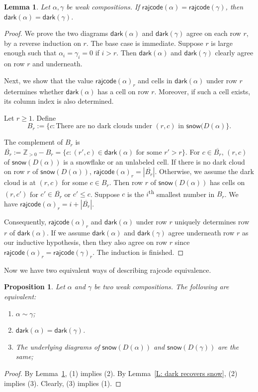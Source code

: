 \documentclass[10pt]{amsart}
\theoremstyle{plain}
\theoremstyle{plain}
\theoremstyle{definition}
\theoremstyle{definition}
\theoremstyle{definition}
\theoremstyle{plain}
\theoremstyle{plain}
\theoremstyle{plain}
\newtheorem{lemma}[lemma]{Lemma}
\theoremstyle{plain}
\newtheorem{prop}[prop]{Proposition}
\theoremstyle{plain}
\theoremstyle{remark}
\theoremstyle{remark}
\theoremstyle{plain}
\theoremstyle{plain}
\newcommand{\dark}{\mathsf{dark}}
\newcommand{\snow}{\mathsf{snow}}
\newcommand{\rajcode}{\mathsf{rajcode}}
\begin{document}
\begin{lemma}
\label{L: same rajcode => same dark}
Let $\alpha, \gamma$ be weak compositions.
If $\rajcode(\alpha) = \rajcode(\gamma)$,
then $\dark(\alpha) = \dark(\gamma)$.
\end{lemma}
\begin{proof}
We prove the two diagrams $\dark(\alpha)$ 
and $\dark(\gamma)$ agree on each row $r$,
by a reverse induction on $r$.
The base case is immediate.
Suppose $r$ is large enough
such that $\alpha_i = \gamma_i = 0$
if $i > r$.
Then $\dark(\alpha)$ and $\dark(\gamma)$
clearly agree on row $r$ and underneath.

Next, we show that the value $\rajcode(\alpha)_r$ and cells in $\dark(\alpha)$ under row $r$ 
determines whether $\dark(\alpha)$ has a cell on row $r$.
Moreover, if such a cell exists, its column index is also determined. 

Let $r\geqslant 1$.
Define
$$B_r :=\{c: \textrm{There are no dark clouds under } (r,c) \textrm{ in } \snow(D(\alpha) \}.$$

The complement of $B_r$ is $\overline{B_r} := \mathbb{Z}_{>0} - B_r = \{c: (r',c) \in \dark(\alpha) \textrm{ for some } r' > r \}$.
For $c \in \overline{B_r}$,
$(r,c)$ of $\snow(D(\alpha))$ is a snowflake or an unlabeled cell.
If there is no dark cloud on row $r$ of $\snow(D(\alpha))$,
$\rajcode(\alpha)_r = |\overline{B_r}|$.
Otherwise, we assume the dark cloud is at $(r,c)$ for some $c \in B_r$.
Then row $r$ of $\snow(D(\alpha))$ has cells on 
$(r,c')$ for $c' \in \overline{B_r}$ or $c' \leq c$.
Suppose $c$ is the $i$\textsuperscript{th} smallest number in $B_r$.
We have $\rajcode(\alpha)_r = i + |\overline{B_r}|$.

Consequently, $\rajcode(\alpha)_r$ and $\dark(\alpha)$ under row $r$
uniquely determines row $r$ of $\dark(\alpha)$.
If we assume $\dark(\alpha)$ and $\dark(\gamma)$
agree underneath row $r$ as our inductive hypothesis,
then they also agree on row $r$ since $\rajcode(\alpha)_r = \rajcode(\gamma)_r$.
The induction is finished. 
\end{proof}

Now we have two equivalent ways of describing rajcode equivalence.
\begin{prop}
\label{P: equivalence}
Let $\alpha$ and $\gamma$ be two weak compositions. 
The following are equivalent:
\begin{enumerate}
\item $\alpha \sim \gamma$;
\item $\dark(\alpha) = \dark(\gamma)$.
\item The underlying diagrams of $\snow(D(\alpha))$ and  $\snow(D(\gamma))$
are the same;
\end{enumerate}
\end{prop}
\begin{proof}
By Lemma~\ref{L: same rajcode => same dark}, (1) implies (2).
By Lemma~\ref{L: dark recovers snow}, (2) implies (3).
Clearly, (3) implies (1).
\end{proof}
\end{document}
